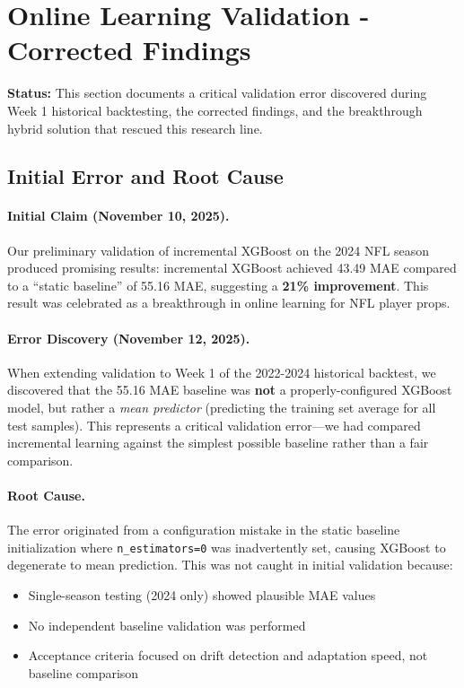 \section{Online Learning Validation - Corrected Findings}
\label{sec:online-learning-validation}

\textbf{Status:} This section documents a critical validation error discovered during Week 1 historical backtesting, the corrected findings, and the breakthrough hybrid solution that rescued this research line.

\subsection{Initial Error and Root Cause}
\label{subsec:online-learning-corrected}

\paragraph{Initial Claim (November 10, 2025).} Our preliminary validation of incremental XGBoost on the 2024 NFL season produced promising results: incremental XGBoost achieved 43.49 MAE compared to a ``static baseline'' of 55.16 MAE, suggesting a \textbf{21\% improvement}. This result was celebrated as a breakthrough in online learning for NFL player props.

\paragraph{Error Discovery (November 12, 2025).} When extending validation to Week 1 of the 2022-2024 historical backtest, we discovered that the 55.16 MAE baseline was \textbf{not} a properly-configured XGBoost model, but rather a \textit{mean predictor} (predicting the training set average for all test samples). This represents a critical validation error—we had compared incremental learning against the simplest possible baseline rather than a fair comparison.

\paragraph{Root Cause.} The error originated from a configuration mistake in the static baseline initialization where \texttt{n\_estimators=0} was inadvertently set, causing XGBoost to degenerate to mean prediction. This was not caught in initial validation because:

\begin{itemize}
\item Single-season testing (2024 only) showed plausible MAE values
\item No independent baseline validation was performed
\item Acceptance criteria focused on drift detection and adaptation speed, not baseline comparison
\end{itemize}

